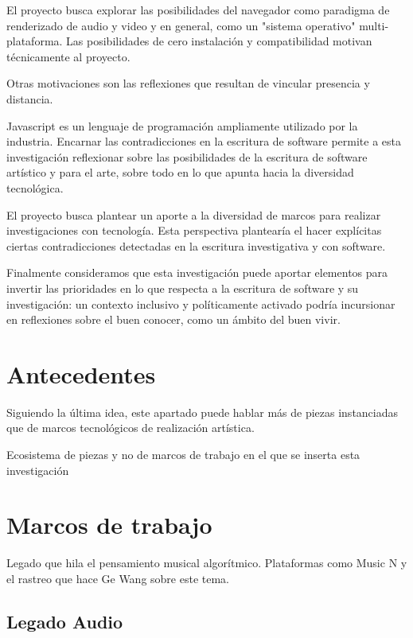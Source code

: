 \documentclass[12pt,a4paper, openright,
headinclude,footinclude,BCOR5mm,
numbers=noenddot,cleardoublepage=empty,
tablecaptionabove]{article}
\begin{document}
El proyecto busca explorar las posibilidades del navegador como paradigma de renderizado de audio y video y en general, como un "sistema operativo" multi-plataforma. Las posibilidades de cero instalación y compatibilidad motivan técnicamente al proyecto.

Otras motivaciones son las reflexiones que resultan de vincular presencia y distancia.


Javascript es un lenguaje de programación ampliamente utilizado por la industria. Encarnar las contradicciones en la escritura de software permite a esta investigación reflexionar sobre las posibilidades de la escritura de software artístico y para el arte, sobre todo en lo que apunta hacia la diversidad tecnológica.

El proyecto busca plantear un aporte a la diversidad de marcos para realizar investigaciones con tecnología. Esta perspectiva plantearía el hacer explícitas ciertas contradicciones detectadas en la escritura investigativa y con software. 

Finalmente consideramos que esta investigación puede aportar elementos para invertir las prioridades en lo que respecta a la escritura de software y su investigación: un contexto inclusivo y políticamente activado podría incursionar en reflexiones sobre el buen conocer, como un ámbito del buen vivir. 

\section{Antecedentes}

Siguiendo la última idea, este apartado puede hablar más de piezas instanciadas que de marcos tecnológicos de realización artística. 

Ecosistema de piezas y no de marcos de trabajo en el que se inserta esta investigación 

\section{Marcos de trabajo}


Legado que hila el pensamiento musical algorítmico. Plataformas como Music N y el rastreo que hace Ge Wang sobre este tema.

\subsection{Legado Audio}
\end{document}
